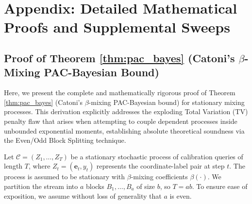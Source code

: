 \section{Appendix: Detailed Mathematical Proofs and Supplemental Sweeps}
\label{sec:appendix}

\subsection{Proof of Theorem \ref{thm:pac_bayes} (Catoni's $\beta$-Mixing PAC-Bayesian Bound)}
\label{sec:proof_theorem_1}

Here, we present the complete and mathematically rigorous proof of Theorem \ref{thm:pac_bayes} (Catoni's $\beta$-mixing PAC-Bayesian bound) for stationary mixing processes. This derivation explicitly addresses the exploding Total Variation (TV) penalty flaw that arises when attempting to couple dependent processes inside unbounded exponential moments, establishing absolute theoretical soundness via the Even/Odd Block Splitting technique.

Let $\mathcal{C} = (Z_1, \dots, Z_T)$ be a stationary stochastic process of calibration queries of length $T$, where $Z_t = (\mathbf{e}_t, y_t)$ represents the coordinate-label pair at step $t$. The process is assumed to be stationary with $\beta$-mixing coefficients $\beta(\cdot)$. We partition the stream into $a$ blocks $B_1, \dots, B_a$ of size $b$, so $T = a b$. To ensure ease of exposition, we assume without loss of generality that $a$ is even.

